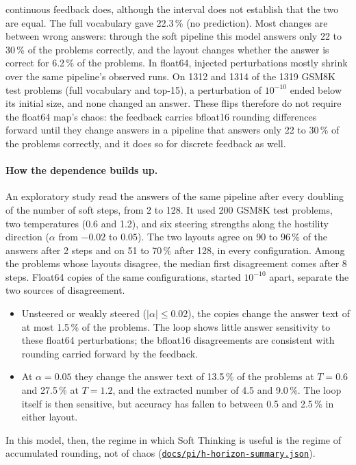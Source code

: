 \documentclass[11pt,letterpaper]{article}
\newcommand{\repourl}{https://github.com/tdj28/neural-shrimp}
\newcommand{\reporef}{arxiv-v1}
\newcommand{\repo}[1]{\href{\repourl/blob/\reporef/#1}{\nolinkurl{#1}}}
\begin{document}
continuous feedback does, although the interval does not establish that the two are equal.
The full vocabulary gave 22.3\,\% (no prediction). Most changes are between wrong answers: through the soft pipeline
this model answers only 22 to 30\,\% of the problems correctly, and the layout changes whether the answer is correct
for 6.2\,\% of the problems. In float64, injected perturbations mostly shrink over the same pipeline's observed runs. On 1312 and 1314 of the 1319 GSM8K test problems
(full vocabulary and top-15), a perturbation of $10^{-10}$ ended below its initial size, and none changed an answer.
These flips therefore do not require the float64 map's chaos: the feedback carries bfloat16 rounding differences forward
until they change answers in a pipeline that answers only 22 to 30\,\% of the problems correctly, and it does so for
discrete feedback as well.

\paragraph{How the dependence builds up.} An exploratory study read the answers of the same pipeline after every
doubling of the number of soft steps, from 2 to 128. It used 200 GSM8K test problems, two temperatures (0.6 and 1.2),
and six steering strengths along the hostility direction ($\alpha$ from $-0.02$ to $0.05$). The two layouts agree on
90 to 96\,\% of the answers after 2 steps and on 51 to 70\,\% after 128, in every configuration. Among the problems
whose layouts disagree, the median first disagreement comes after 8 steps. Float64 copies of the same configurations,
started $10^{-10}$ apart, separate the two sources of disagreement.
\begin{itemize}
  \item Unsteered or weakly steered ($|\alpha|\le0.02$), the copies change the answer text of at most 1.5\,\% of the problems. The loop
  shows little answer sensitivity to these float64 perturbations; the bfloat16 disagreements are consistent with rounding carried forward by the feedback.
  \item At $\alpha=0.05$ they change the answer text of 13.5\,\% of the problems at $T=0.6$ and 27.5\,\% at $T=1.2$, and
  the extracted number of 4.5 and 9.0\,\%. The loop itself is
  then sensitive, but accuracy has fallen to between 0.5 and 2.5\,\% in either layout.
\end{itemize}
In this model, then, the regime in which Soft Thinking is useful is the regime of accumulated rounding, not of chaos
(\repo{docs/pi/h-horizon-summary.json}).
\end{document}
